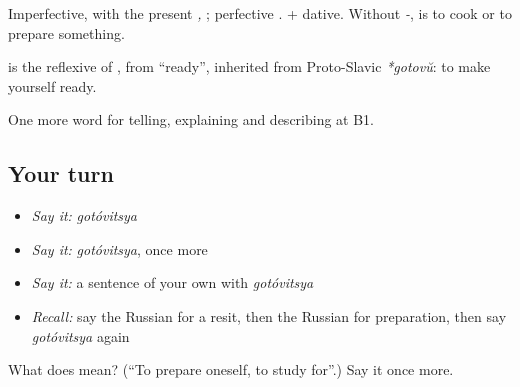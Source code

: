 Imperfective, with the present \emph{, }; perfective \emph{}. \emph{ } + dative. Without \emph{-}, \emph{} is to cook or to prepare something.

\begin{cousinweb}
\textbf{} is the reflexive of \emph{}, from \emph{} \textquotedblleft{}ready\textquotedblright{}, inherited from Proto-Slavic \emph{*gotovŭ}: to make yourself ready.
\end{cousinweb}

\begin{grammarlens}[title={What you've built}]
One more word for telling, explaining and describing at B1.
\end{grammarlens}

\subsection*{Your turn}
\begin{itemize}
\raggedright
  \item \emph{Say it:} \emph{gotóvitsya}
  \item \emph{Say it:} \emph{gotóvitsya}, once more
  \item \emph{Say it:} a sentence of your own with \emph{gotóvitsya}
  \item \emph{Recall:} say the Russian for a resit, then the Russian for preparation, then say \emph{gotóvitsya} again
\end{itemize}

\begin{tcolorbox}[breakable,colback=teal!4,colframe=teal!35!black,title={Before you move on}]
What does  mean? (\textquotedblleft{}To prepare oneself, to study for\textquotedblright{}.) Say it once more.
\end{tcolorbox}
